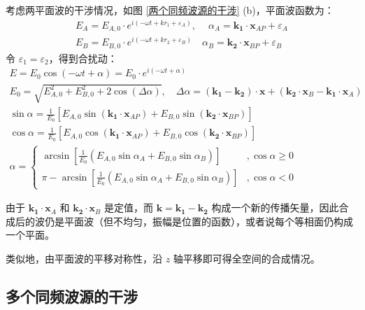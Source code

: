 \documentclass[UTF8]{report}
\theoremstyle{MyLineTheoremStyle} %
\theoremstyle{MyBlockTheoremStyle} %
\theoremstyle{MySubsubsectionStyle} %
\begin{document}
考虑两平面波的干涉情况，如图 \ref{两个同频波源的干涉} (b)，平面波函数为：
\begin{gather}
    E_A = E_{A,0}\cdot e^{i(-\omega t + k r_1 + \varepsilon_A)},\quad \ \alpha_A = \boldsymbol{k_1}  \cdot  \boldsymbol{x}_{AP} + \varepsilon_A
    \\
    E_B = E_{B,0} \cdot e^{i(-\omega t + k r_2  + \varepsilon_B)}\quad  \alpha_B = \boldsymbol{k_2} \cdot \boldsymbol{x}_{BP}  + \varepsilon_B
\end{gather}
令 $\varepsilon_1 = \varepsilon_2$，得到合扰动：
\begin{gather}
    E = E_0 \cos \left(-\omega t + \alpha \right) = E_0 \cdot e^{i(-\omega t + \alpha)} \\ 
    E_0 = \sqrt{E_{A,0}^2 + E_{B,0}^2 + 2 \cos \left( \Delta \alpha \right)} ,\quad \Delta \alpha =  (\boldsymbol{k_1} -\boldsymbol{k_2})\cdot \boldsymbol{x} + (\boldsymbol{k_2}\cdot \boldsymbol{x}_B - \boldsymbol{k_1} \cdot \boldsymbol{x}_A)\\ 
        \sin \alpha = \frac{1}{E_0}\left[ E_{A,0}\sin ( \boldsymbol{k_1}  \cdot  \boldsymbol{x}_{AP}) + E_{B,0}\sin (\boldsymbol{k_2} \cdot \boldsymbol{x}_{BP}) \right] \\ 
        \cos \alpha = \frac{1}{E_0}\left[ E_{A,0}\cos ( \boldsymbol{k_1}  \cdot  \boldsymbol{x}_{AP}) + E_{B,0}\cos (\boldsymbol{k_2} \cdot \boldsymbol{x}_{BP}) \right] \\ 
    \alpha = 
    \begin{cases}
        \arcsin \left[ \frac{1}{E_0}\left( E_{A,0}\sin \alpha_A + E_{B,0}\sin \alpha_B \right)  \right] &, \cos \alpha \geqslant 0 \\
        \pi - \arcsin \left[ \frac{1}{E_0}\left( E_{A,0}\sin \alpha_A + E_{B,0}\sin \alpha_B \right)  \right] &,  \cos \alpha < 0
    \end{cases}
\end{gather}

由于 $\boldsymbol{k_1} \cdot \boldsymbol{x}_A$ 和 $\boldsymbol{k_2} \cdot \boldsymbol{x}_B$ 是定值，而 $\boldsymbol{k} = \boldsymbol{k_1} - \boldsymbol{k_2}$ 构成一个新的传播矢量，因此合成后的波仍是平面波（但不均匀，振幅是位置的函数），或者说每个等相面仍构成一个平面。

类似地，由平面波的平移对称性，沿 $z$ 轴平移即可得全空间的合成情况。

\subsection{多个同频波源的干涉}
\end{document}
